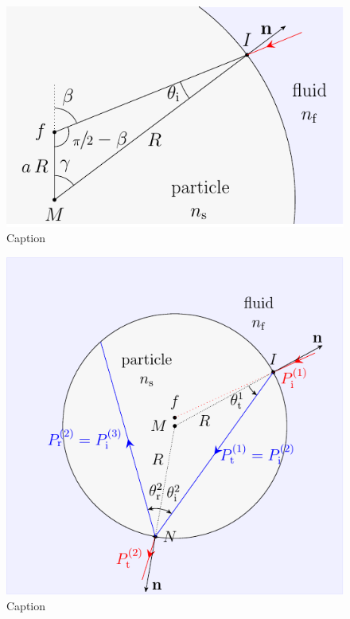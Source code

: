 \begin{figure}[htp]
  \centering
  \includegraphics[]{Plots/cache/angles.pdf}
  \caption{Caption}
  \label{fig:T_angles}
\end{figure}

\lipsum[1-5]

\begin{figure}[htp]
  \centering
  \includegraphics[]{Plots/cache/ray.pdf}
  \caption{Caption}
  \label{fig:T_ray_particle}
\end{figure}

